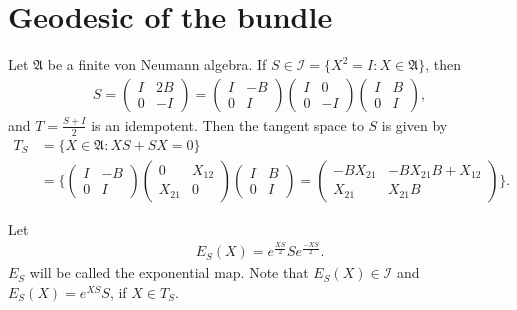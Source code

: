 \documentclass[a4paper,10pt]{amsart}
\newcommand{\AAA}{\mathfrak A}
\begin{document}
\section{Geodesic of the bundle}
Let $\AAA$ be a finite von Neumann algebra.
If $S \in \mathcal{I} = \{X^{2}=I : X \in \AAA \}$, then
\begin{align*}
   S = \begin{pmatrix}
       I & 2B \\
       0 & -I
   \end{pmatrix} = 
   \begin{pmatrix}
       I & -B \\
       0 & I
   \end{pmatrix}
   \begin{pmatrix}
       I & 0 \\
       0 & -I
   \end{pmatrix}
   \begin{pmatrix}
       I & B \\
       0 & I
   \end{pmatrix}, 
\end{align*}
and $T = \frac{S+I}{2}$ is an idempotent.
Then the tangent space to $S$ is given by
\begin{align*}
    T_{S} &= \{X \in \AAA : XS + SX = 0 \}\\
          &= 
    \{ \begin{pmatrix}
       I & -B \\
       0 & I
   \end{pmatrix}
   \begin{pmatrix}
        0 & X_{12} \\
        X_{21} & 0
    \end{pmatrix} 
    \begin{pmatrix}
       I & B \\
       0 & I
   \end{pmatrix}
   =
   \begin{pmatrix}
       -BX_{21} & -BX_{21}B+X_{12}\\
       X_{21} & X_{21}B
   \end{pmatrix}
   \}. 
\end{align*}

Let 
\begin{align*}
    E_{S}(X) = e^{\frac{XS}{2}}Se^{\frac{-XS}{2}}. 
\end{align*}
$E_{S}$ will be called the exponential map. Note that
$E_{S}(X) \in \mathcal{I}$ and 
$E_{S}(X) = e^{XS}S$, if $X \in T_{S}$.
\end{document}
